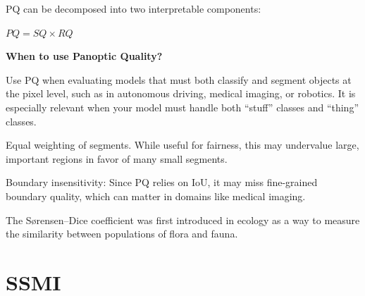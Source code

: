 PQ can be decomposed into two interpretable components:

\begin{center}
    $PQ = SQ \times RQ$
\end{center}

\textbf{When to use Panoptic Quality?}

Use PQ when evaluating models that must both classify and segment objects at the pixel level, such
as in autonomous driving, medical imaging, or robotics. It is especially relevant when your model
must handle both “stuff” classes and “thing” classes.


{
\item Equal weighting of segments. While useful for fairness, this may undervalue large, important regions in favor of many small segments.
\item Boundary insensitivity: Since PQ relies on IoU, it may miss fine-grained boundary quality,
which can matter in domains like medical imaging.
}

\clearpage

\thispagestyle{customstyle}

{The S{\o}rensen–Dice coefficient was first introduced in ecology as a way to measure the similarity
between populations of flora and fauna.}



\clearpage
\thispagestyle{cvstyle}
\section{SSMI}
